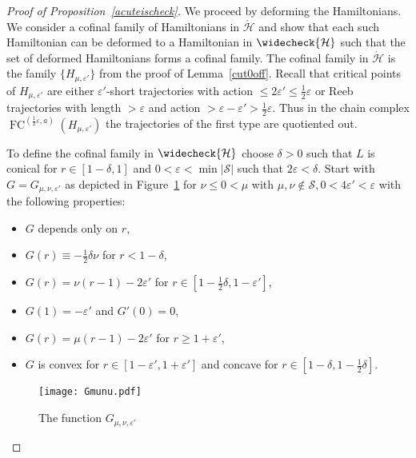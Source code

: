 \documentclass{amsart}
\newcommand{\Hcal}{{\mathcal{H}}}
\newcommand{\Scal}{{\mathcal{S}}}
\newcommand{\FC}{\operatorname{FC}}
\theoremstyle{definition}
\theoremstyle{remark}
\numberwithin{equation}{section}
\begin{document}
\begin{proof}[Proof of Proposition~\ref{acuteischeck}]
We proceed by deforming the Hamiltonians. We consider a cofinal family of Hamiltonians in $\acute \Hcal$ and show that each such Hamiltonian can be deformed to a Hamiltonian in $\widecheck\Hcal$ such that the set of deformed Hamiltonians forms a cofinal family. 
The cofinal family in $\acute\Hcal$ is the family $\{H_{\mu,\varepsilon'}\}$ from the proof of Lemma~\ref{cut0off}. Recall that critical points of $H_{\mu,\varepsilon'}$ are either $\varepsilon'$-short trajectories with action $\leq2\varepsilon'\leq\frac12\varepsilon$ or Reeb trajectories with length $>\varepsilon$ and action $>\varepsilon-\varepsilon'>\frac12\varepsilon$. Thus in the chain complex $\FC^{(\frac12\varepsilon,a)}(H_{\mu,\varepsilon'})$ the trajectories of the first type are quotiented out. 

To define the cofinal family in $\widecheck\Hcal$ choose $\delta>0$ such that $L$ is conical for $r\in[1-\delta,1]$ and $0<\varepsilon<\min|\Scal|$ such that $2\varepsilon<\delta$. Start with $G=G_{\mu,\nu,\varepsilon'}$ as depicted in Figure~\ref{fig:Gmunu} for $\nu\leq0<\mu$ with $\mu,\nu\notin\Scal, 0<4\varepsilon'<\varepsilon$ with the following properties:
\begin{itemize}
	\item $G$ depends only on $r$,
	\item $G(r)\equiv -\frac12\delta\nu$ for $r<1-\delta$,
	\item $G(r)= \nu (r-1)-2\varepsilon'$ for $r\in [1-\frac12\delta,1-\varepsilon']$,
	\item $G(1)= -\varepsilon'$ and $G'(0)=0$,
	\item $G(r)= \mu (r-1)-2\varepsilon'$ for $r\geq1+\varepsilon'$,
	\item $G$ is convex for $r\in[1-\varepsilon',1+\varepsilon']$ and concave for $r\in[1-\delta,1-\frac12\delta]$.
\end{itemize}

\begin{figure}[h]
	\centering
		\texttt{[image: Gmunu.pdf]}
	\caption{The function $G_{\mu,\nu,\varepsilon'}$}
	\label{fig:Gmunu}
\end{figure}


\end{proof}
\end{document}

